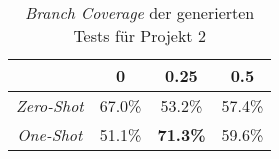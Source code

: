 \bgroup
\def\arraystretch{2}
\begin{table}[H]
	\vspace{.5cm}
	\centering		
	\begin{center}
		\begin{tabular}{|c||c|c|c|}
			\hline 
			& 0 & 0.25 & 0.5 \\
			\hline 
			\hline
			\textit{Zero-Shot} & 67.0\% & 53.2\% & 57.4\% \\
			\hline
			\textit{One-Shot} & 51.1\% & \textbf{71.3\%} & 59.6\% \\
			\hline
		\end{tabular} 
	\end{center}
	\caption{\textit{Branch Coverage} der generierten Tests für Projekt 2}
	\label{fig:branch-2}
	\vspace{-.8cm}
\end{table}
\egroup